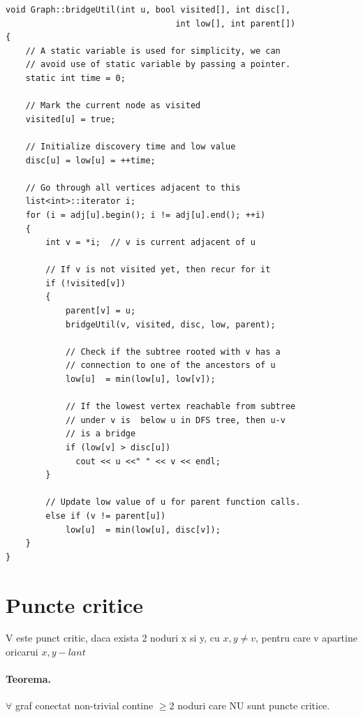 \documentclass{article}
\begin{document}
\begin{lstlisting}
void Graph::bridgeUtil(int u, bool visited[], int disc[],
                                  int low[], int parent[])
{
    // A static variable is used for simplicity, we can
    // avoid use of static variable by passing a pointer.
    static int time = 0;
 
    // Mark the current node as visited
    visited[u] = true;
 
    // Initialize discovery time and low value
    disc[u] = low[u] = ++time;
 
    // Go through all vertices adjacent to this
    list<int>::iterator i;
    for (i = adj[u].begin(); i != adj[u].end(); ++i)
    {
        int v = *i;  // v is current adjacent of u
 
        // If v is not visited yet, then recur for it
        if (!visited[v])
        {
            parent[v] = u;
            bridgeUtil(v, visited, disc, low, parent);
 
            // Check if the subtree rooted with v has a
            // connection to one of the ancestors of u
            low[u]  = min(low[u], low[v]);
 
            // If the lowest vertex reachable from subtree
            // under v is  below u in DFS tree, then u-v
            // is a bridge
            if (low[v] > disc[u])
              cout << u <<" " << v << endl;
        }
 
        // Update low value of u for parent function calls.
        else if (v != parent[u])
            low[u]  = min(low[u], disc[v]);
    }
}
    \end{lstlisting}

\section{Puncte critice} V este punct critic, daca exista 2 noduri x si y, cu $x,y \neq v$, pentru care v apartine oricarui $x,y-lant$

\paragraph*{Teorema.} $\forall$ graf conectat non-trivial contine $\geq 2$ noduri care NU sunt puncte critice.
\end{document}
